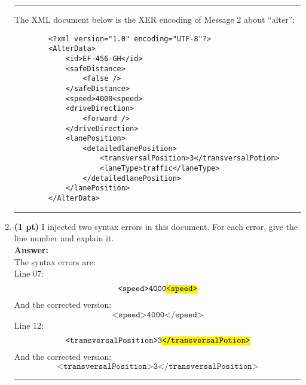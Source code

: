 \documentclass[a4paper,10pt]{article}
\begin{document}
\begin{enumerate}[label=\textbf{Question \arabic*.}]
    \noindent\rule{\textwidth}{0.4mm}
    The XML document below is the XER encoding of Message 2 about “alter”: \\

    \begin{lstlisting}
        <?xml version="1.0" encoding="UTF-8"?>
        <AlterData>
            <id>EF-456-GH</id>
            <safeDistance>
                <false />
            </safeDistance>
            <speed>4000<speed>
            <driveDirection>
                <forward />
            </driveDirection>
            <lanePosition>
                <detailedlanePosition>
                    <transversalPosition>3</transversalPotion>
                    <laneType>traffic</laneType>
                </detailedlanePosition>
            </lanePosition>
        </AlterData>
    \end{lstlisting}
    \noindent\rule{\textwidth}{0.4mm}
    
    \item \textbf{(1 pt)} I injected two syntax errors in this document. For each error, give the line number and explain it. \\

    \textbf{Answer:} \\
    The syntax errors are: \\

    Line 07:
    \[\texttt{<speed>4000\hl{<speed>}}\]
    And the corrected version:
    \[\texttt{<speed>4000</speed>}\]
    Line 12:
    \[\texttt{<transversalPosition>3\hl{</transversalPotion>}}\]
    And the corrected version:
    \[\texttt{<transversalPosition>3</transversalPosition>}\]

    \noindent\rule{\textwidth}{0.4mm}


\end{enumerate}
\end{document}
